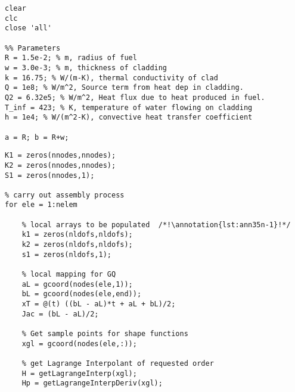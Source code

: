 \begin{lstlisting}[style=myMatlab,name=lec35n-ex]
clear
clc
close 'all'

%% Parameters
R = 1.5e-2; % m, radius of fuel
w = 3.0e-3; % m, thickness of cladding
k = 16.75; % W/(m-K), thermal conductivity of clad
Q = 1e8; % W/m^2, Source term from heat dep in cladding.
Q2 = 6.32e5; % W/m^2, Heat flux due to heat produced in fuel.
T_inf = 423; % K, temperature of water flowing on cladding
h = 1e4; % W/(m^2-K), convective heat transfer coefficient

a = R; b = R+w;
\end{lstlisting}

\begin{lstlisting}[style=myMatlab,name=lec35n-ex]
% initialize global arrays
K1 = zeros(nnodes,nnodes);
K2 = zeros(nnodes,nnodes);
S1 = zeros(nnodes,1);

% carry out assembly process
for ele = 1:nelem

    % local arrays to be populated  /*!\annotation{lst:ann35n-1}!*/
    k1 = zeros(nldofs,nldofs);
    k2 = zeros(nldofs,nldofs);
    s1 = zeros(nldofs,1);
    
    % local mapping for GQ
    aL = gcoord(nodes(ele,1));
    bL = gcoord(nodes(ele,end));
    xT = @(t) ((bL - aL)*t + aL + bL)/2;
    Jac = (bL - aL)/2;

    % Get sample points for shape functions
    xgl = gcoord(nodes(ele,:));
    
    % get Lagrange Interpolant of requested order
    H = getLagrangeInterp(xgl);
    Hp = getLagrangeInterpDeriv(xgl);
\end{lstlisting}

